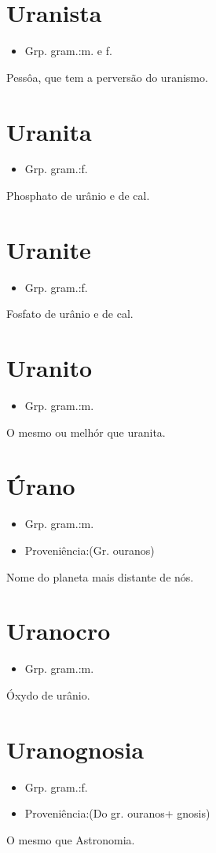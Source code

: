 \documentclass{article}
\begin{document}
\section{Uranista}
\begin{itemize}
\item {Grp. gram.:m.  e  f.}
\end{itemize}
Pessôa, que tem a perversão do uranismo.
\section{Uranita}
\begin{itemize}
\item {Grp. gram.:f.}
\end{itemize}
Phosphato de urânio e de cal.
\section{Uranite}
\begin{itemize}
\item {Grp. gram.:f.}
\end{itemize}
Fosfato de urânio e de cal.
\section{Uranito}
\begin{itemize}
\item {Grp. gram.:m.}
\end{itemize}
O mesmo ou melhór que \textunderscore uranita\textunderscore .
\section{Úrano}
\begin{itemize}
\item {Grp. gram.:m.}
\end{itemize}
\begin{itemize}
\item {Proveniência:(Gr. \textunderscore ouranos\textunderscore )}
\end{itemize}
Nome do planeta mais distante de nós.
\section{Uranocro}
\begin{itemize}
\item {Grp. gram.:m.}
\end{itemize}
Óxydo de urânio.
\section{Uranognosia}
\begin{itemize}
\item {Grp. gram.:f.}
\end{itemize}
\begin{itemize}
\item {Proveniência:(Do gr. \textunderscore ouranos\textunderscore  + \textunderscore gnosis\textunderscore )}
\end{itemize}
O mesmo que \textunderscore Astronomia\textunderscore .
\end{document}
